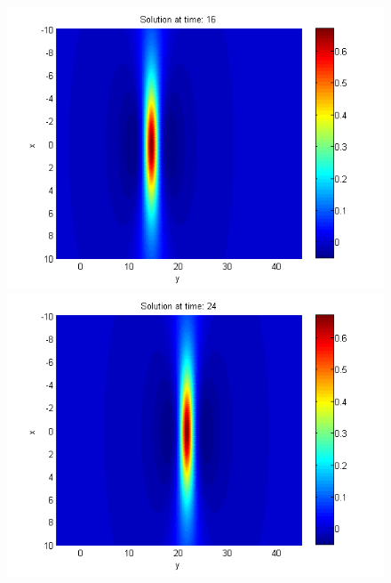 \documentclass[11pt,a4paper,twoside]{article}
\begin{document}
\begin{figure}[!htbp]
\begin{minipage}[b]{0.31\linewidth}
	\end{minipage}	
	\begin{minipage}[b]{0.31\linewidth}
		 \includegraphics[width=\linewidth]{Pictures/Solution1_t=16.png}
	\end{minipage}
	\begin{minipage}[b]{0.31\linewidth}
		\includegraphics[width=\linewidth]{Pictures/Solution1_t=24.png}
	\end{minipage}	
	\begin{minipage}[b]{0.31\linewidth}

\end{minipage}
\end{figure}
\end{document}

